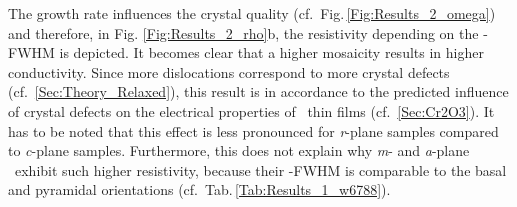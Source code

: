 The growth rate influences the crystal quality (cf.\ Fig.\,\ref{Fig:Results_2_omega}) and therefore, in Fig. \ref{Fig:Results_2_rho}b, the resistivity depending on the \textomega-FWHM is depicted. %
It becomes clear that a higher mosaicity results in higher conductivity.
Since more dislocations correspond to more crystal defects (cf.~\ref{Sec:Theory_Relaxed}), this result is in accordance to the predicted influence of crystal defects on the electrical properties of \cro\ thin films (cf.~\ref{Sec:Cr2O3}).
It has to be noted that this effect is less pronounced for \textit{r}-plane samples compared to \textit{c}-plane samples.
Furthermore, this does not explain why \textit{m}- and \textit{a}-plane \cro\ exhibit such higher resistivity, because their \textomega-FWHM is comparable to the basal and pyramidal orientations (cf.\ Tab.\,\ref{Tab:Results_1_w6788}).

